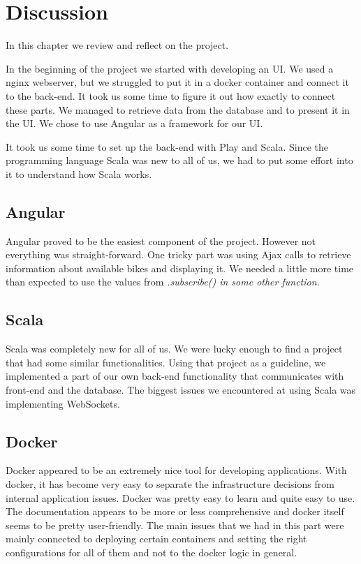 \section{Discussion}

In this chapter we review and reflect on the project.

In the beginning of the project we started with developing an UI. We used a nginx webserver, but we struggled to put it in a docker container and connect it to the back-end. It took us some time to figure it out how exactly to connect these parts. We managed to retrieve data from the database and to present it in the UI. We chose to use Angular as a framework for our UI.

It took us some time to set up the back-end with Play and Scala. Since the programming language Scala was new to all of us, we had to put some effort into it to understand how Scala works.
\subsection{Angular}
Angular proved to be the easiest component of the project.  However not everything was straight-forward. One tricky part was using Ajax calls to retrieve information about available bikes and displaying it. We needed a little more time than expected to use the values from \it{.subscribe()} in some other function.
\subsection{Scala}
Scala was completely new for all of us. We were lucky enough to find a project that had some similar functionalities. Using that project as a guideline, we implemented a part of our own back-end functionality that communicates with front-end and the database. The biggest issues we encountered at using Scala was implementing WebSockets.
\subsection{Docker}
Docker appeared to be an extremely nice tool for developing applications. With docker, it has become very easy to separate the infrastructure decisions from internal application issues. Docker was pretty easy to learn and quite easy to use. The documentation appears to be more or less comprehensive and docker itself seems to be pretty user-friendly. The main issues that we had in this part were mainly connected to deploying certain containers and setting the right configurations for all of them and not to the docker logic in general.

